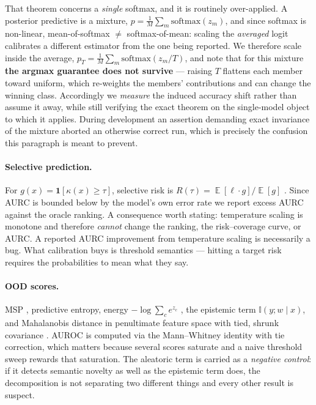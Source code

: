 \documentclass{article}
\DeclareMathOperator*{\E}{\mathbb{E}}
\newcommand{\MI}{\mathbb{I}}
\begin{document}
That theorem concerns a \emph{single} softmax, and it is routinely over-applied.
A posterior predictive is a mixture, $p = \frac{1}{M}\sum_m \mathrm{softmax}(z_m)$,
and since softmax is non-linear, mean-of-softmax $\neq$ softmax-of-mean: scaling
the \emph{averaged} logit calibrates a different estimator from the one being
reported. We therefore scale inside the average,
$p_T = \frac{1}{M}\sum_m \mathrm{softmax}(z_m/T)$, and note that for this mixture
\textbf{the argmax guarantee does not survive} --- raising $T$ flattens each
member toward uniform, which re-weights the members' contributions and can change
the winning class. Accordingly we \emph{measure} the induced accuracy shift
rather than assume it away, while still verifying the exact theorem on the
single-model object to which it applies. During development an assertion
demanding exact invariance of the mixture aborted an otherwise correct run, which
is precisely the confusion this paragraph is meant to prevent.

\paragraph{Selective prediction.} For $g(x) = \mathbf{1}[\kappa(x) \ge \tau]$,
selective risk is $R(\tau) = \E[\ell \cdot g]/\E[g]$
\citep{elyaniv2010, geifman2017selective}. Since AURC is bounded below by the
model's own error rate we report excess AURC against the oracle ranking. A
consequence worth stating: temperature scaling is monotone and therefore
\emph{cannot} change the ranking, the risk--coverage curve, or AURC. A reported
AURC improvement from temperature scaling is necessarily a bug. What calibration
buys is threshold semantics --- hitting a target risk requires the probabilities
to mean what they say.

\paragraph{OOD scores.} MSP \citep{hendrycks2017baseline}, predictive entropy,
energy $-\log\sum_c e^{z_c}$ \citep{liu2020energy}, the epistemic term
$\MI(y;w\mid x)$, and Mahalanobis distance in penultimate feature space with tied,
shrunk covariance \citep{lee2018mahalanobis}. AUROC is computed via the
Mann--Whitney identity with tie correction, which matters because several scores
saturate and a naive threshold sweep rewards that saturation. The aleatoric term
is carried as a \emph{negative control}: if it detects semantic novelty as well
as the epistemic term does, the decomposition is not separating two different
things and every other result is suspect.
\end{document}
